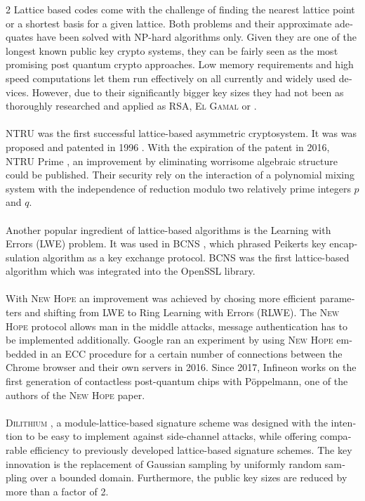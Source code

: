 \documentclass[a4paper,11pt]{article}
\begin{document}
\begin{otherlanguage}{english}
\begin{multicols}{2}
Lattice based codes come with the challenge of finding the nearest lattice point or a shortest basis for a given lattice. Both problems and their approximate adequates have been solved with NP-hard algorithms only. Given they are one of the longest known public key crypto systems, they can be fairly seen as the most promising post quantum crypto approaches. Low memory requirements and high speed computations let them run effectively on all currently and widely used devices. However, due to their significantly bigger key sizes they had not been as thoroughly researched and applied as \textsc{RSA}, \textsc{El Gamal} \cite{IMC} or . \\
\\
\textsc{NTRU} was the first successful lattice-based asymmetric cryptosystem. It was was proposed and patented in 1996 \cite{NTR}. With the expiration of the patent in 2016, \textsc{NTRU} Prime \cite{NTP}, an improvement by eliminating worrisome algebraic structure could be published. Their security rely on the interaction of a polynomial mixing system with the independence of reduction modulo two relatively prime integers $p$ and $q$. \\
\\
Another popular ingredient of lattice-based algorithms is the Learning with Errors (LWE) problem. It was used in \textsc{BCNS} \cite{BCN}, which phrased Peikerts key encapsulation algorithm as a key exchange protocol. \textsc{BCNS} was the first lattice-based algorithm which was integrated into the OpenSSL library. \\
\\
With \textsc{New Hope} \cite{NHP} an improvement was achieved by chosing more efficient parameters and shifting from LWE to Ring Learning with Errors (RLWE). The \textsc{New Hope} protocol allows man in the middle attacks, message authentication has to be implemented additionally. Google ran an experiment by using \textsc{New Hope} embedded in an ECC procedure for a certain number of connections between the Chrome browser and their own servers in 2016. Since 2017, Infineon works on the first generation of contactless post-quantum chips with Pöppelmann, one of the authors of the \textsc{New Hope} paper. \\
\\
\textsc{Dilithium} \cite{DLM}, a module-lattice-based signature scheme was designed with the intention to be easy to implement against side-channel attacks, while offering comparable efficiency to previously developed lattice-based signature schemes. The key innovation is the replacement of Gaussian sampling by uniformly random sampling over a bounded domain. Furthermore, the public key sizes are reduced by more than a factor of 2.\\

\end{multicols}
\end{otherlanguage}
\end{document}
